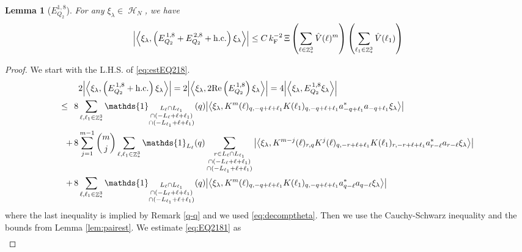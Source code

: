 \documentclass[12pt,a4paper]{article}
\numberwithin{equation}{section}
\newcommand{\1}{\mathbb{I}}
\newcommand{\F}{\mathrm{F}}
\DeclareMathOperator{\Z}{\mathbb{Z}}
\DeclareMathOperator{\HH}{\mathcal{H}}
\newcommand{\eva}[1]{\left\langle #1 \right\rangle}
\theoremstyle{plain}
\newtheorem{lemma}[theorem]{Lemma}
\theoremstyle{definition}
\theoremstyle{remark}
\theoremstyle{plain}
\theoremstyle{definition}
\theoremstyle{remark}
\begin{document}
\begin{lemma}[$E_{Q_2}^{1,8}$]\label{lem:EQ218}
	For any $\xi_\lambda \in \HH_N$, we have
	\begin{alignat}{2}
		\abs{\eva{\xi_\lambda,\left(E^{\,1,8}_{Q_2}+E^{\,2,8}_{Q_2}+\mathrm{h.c.}\right) \xi_\lambda }}
		\leq  C\, k_{\F}^{-2}\, \Xi \left(\sum\limits_{\ell \in \Z^3_*} \hat{V}(\ell)^m \right) \left(\sum\limits_{\ell_1 \in \Z^3_*} \hat{V}(\ell_1) \right) \label{eq:estEQ218}  
	\end{alignat}
\end{lemma}
\begin{proof}
 We start with the L.H.S. of \eqref{eq:estEQ218}.
\begin{align}
	&2\abs{\eva{\xi_\lambda,\left(E^{\,1,8}_{Q_2}+\mathrm{h.c.}\right) \xi_\lambda }} = 2\abs{\eva{\xi_\lambda,2\mathrm{Re}\left(E^{\,1,8}_{Q_2}\right) \xi_\lambda }} = 4\abs{\eva{\xi_\lambda, E^{\,1,8}_{Q_2} \xi_\lambda }}\nonumber\\
	\leq\,\;8& \sum\limits_{\ell, \ell_1\in \Z^3_*} \mathds{1}_{\substack{L_{\ell}\cap L_{\ell_1}\\\cap (-L_{\ell}+\ell+\ell_1) \\ \cap (-L_{\ell_1}+\ell+\ell_1)}}(q) \abs{\eva{\xi_\lambda, K^m(\ell)_{q,-q+\ell+\ell_1} K(\ell_1)_{q,-q+\ell+\ell_1} a^*_{-q+\ell_1}a_{-q+\ell_1} \xi_\lambda }} \label{eq:EQ2181}\\
	+\,8& \sum\limits_{j=1}^{m-1} {{m}\choose j} \sum\limits_{\ell, \ell_1\in \Z^3_*}\mathds{1}_{L_{\ell}}(q) \sum\limits_{\substack{r\in L_{\ell} \cap L_{\ell_1}\\\cap (-L_{\ell}+\ell+\ell_1) \\ \cap (-L_{\ell_1}+\ell+\ell_1)}}  \abs{\eva{\xi_\lambda, K^{m-j}(\ell)_{r,q} K^j(\ell)_{q,-r+\ell+\ell_1} K(\ell_1)_{r,-r+\ell+\ell_1} a^*_{r-\ell}a_{r-\ell} \xi_\lambda }} \label{eq:EQ2182}\\
	+\,8&\sum\limits_{\ell, \ell_1\in \Z^3_*} \mathds{1}_{\substack{L_{\ell}\cap L_{\ell_1}\\\cap (-L_{\ell}+\ell+\ell_1) \\ \cap (-L_{\ell_1}+\ell+\ell_1)}} (q) \abs{\eva{\xi_\lambda, K^m(\ell)_{q,-q+\ell+\ell_1}K(\ell_1)_{q,-q+\ell+\ell_1} a^*_{q-\ell}a_{q-\ell}\xi_\lambda }} \label{eq:EQ2183}
\end{align}
where the last inequality is implied by Remark \ref{q-q} and we used \eqref{eq:decomptheta}. Then we use the Cauchy-Schwarz inequality and the bounds from Lemma \ref{lem:pairest}.
We estimate \eqref{eq:EQ2181} as 
\begin{align}

\end{align}
\end{proof}
\end{document}

